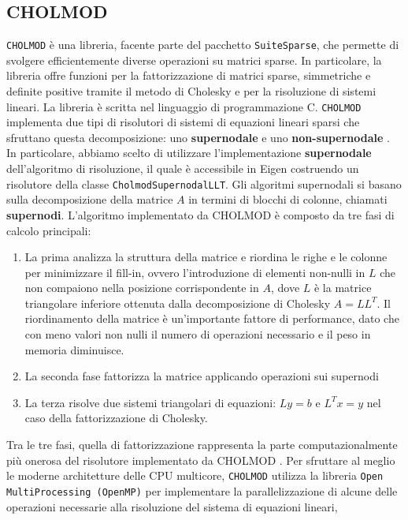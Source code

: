 \subsection{CHOLMOD}
\texttt{CHOLMOD} è una libreria, facente parte del pacchetto \texttt{SuiteSparse}, che permette di svolgere efficientemente diverse operazioni su matrici sparse.
In particolare, la libreria offre funzioni per la fattorizzazione di matrici sparse, simmetriche e definite positive
tramite il metodo di Cholesky e per la risoluzione di sistemi lineari. La libreria è scritta nel linguaggio di programmazione C.
\texttt{CHOLMOD} implementa due tipi di risolutori di sistemi di equazioni lineari sparsi che sfruttano questa decomposizione:
uno \textbf{supernodale} e uno \textbf{non-supernodale} \cite{chen_algorithm_2008}.
In particolare, abbiamo scelto di utilizzare l'implementazione \textbf{supernodale} dell'algoritmo di risoluzione, il quale è accessibile in Eigen costruendo un risolutore della classe \texttt{CholmodSupernodalLLT}\cite{supernodal_chol_eigen}.
Gli algoritmi supernodali si basano sulla decomposizione della matrice $A$ in termini di blocchi di colonne, chiamati \textbf{supernodi}. L'algoritmo implementato da CHOLMOD è composto da tre fasi di calcolo principali:
\begin{enumerate}
	\item La prima analizza la struttura della matrice e riordina le righe e le colonne per minimizzare il fill-in, ovvero l'introduzione di elementi non-nulli in $L$ che non compaiono nella posizione corrispondente in $A$, dove $L$ è la matrice triangolare inferiore ottenuta dalla decomposizione di Cholesky $A = LL^T$.
	Il riordinamento della matrice è un'importante fattore di performance, dato che con meno valori non nulli il numero di operazioni necessario e il peso in memoria diminuisce.
	\item La seconda fase fattorizza la matrice applicando operazioni sui supernodi
	\item La terza risolve due sistemi triangolari di equazioni: $Ly = b$ e $L^T x = y$ nel caso della fattorizzazione di Cholesky.
\end{enumerate}
Tra le tre fasi, quella di fattorizzazione rappresenta la parte computazionalmente più onerosa del risolutore implementato da CHOLMOD \cite{le_fevre_selective_2022}.
Per sfruttare al meglio le moderne architetture delle CPU multicore, \texttt{CHOLMOD} utilizza la libreria \texttt{Open MultiProcessing (OpenMP)} \cite{cholmod_doc} per implementare la parallelizzazione di alcune delle operazioni necessarie alla risoluzione del sistema di equazioni lineari,
